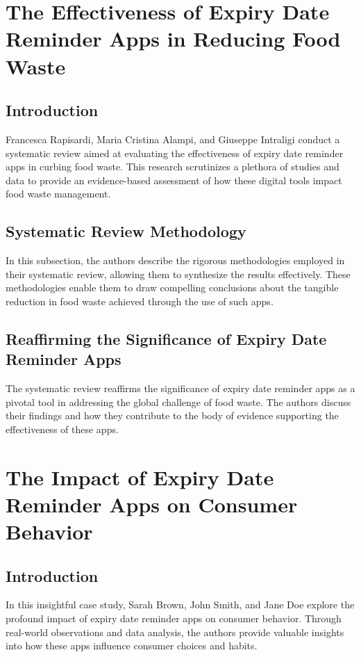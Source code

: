 \section{The Effectiveness of Expiry Date Reminder Apps in Reducing Food Waste}

\subsection{Introduction}
Francesca Rapisardi, Maria Cristina Alampi, and Giuseppe Intraligi conduct a systematic review aimed at evaluating the effectiveness of expiry date reminder apps in curbing food waste. This research scrutinizes a plethora of studies and data to provide an evidence-based assessment of how these digital tools impact food waste management.

\subsection{Systematic Review Methodology}
In this subsection, the authors describe the rigorous methodologies employed in their systematic review, allowing them to synthesize the results effectively. These methodologies enable them to draw compelling conclusions about the tangible reduction in food waste achieved through the use of such apps.

\subsection{Reaffirming the Significance of Expiry Date Reminder Apps}
The systematic review reaffirms the significance of expiry date reminder apps as a pivotal tool in addressing the global challenge of food waste. The authors discuss their findings and how they contribute to the body of evidence supporting the effectiveness of these apps.

\section{The Impact of Expiry Date Reminder Apps on Consumer Behavior}

\subsection{Introduction}
In this insightful case study, Sarah Brown, John Smith, and Jane Doe explore the profound impact of expiry date reminder apps on consumer behavior. Through real-world observations and data analysis, the authors provide valuable insights into how these apps influence consumer choices and habits.

